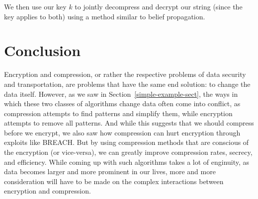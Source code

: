 \documentclass[11pt]{article}
\newcommand\genref{}
\newcommand\sectref{}
\def\genref#1#2{#1~\ref{#2}}
\def\sectref#1{\genref{Section}{#1}}
\begin{document}
We then use our key $k$ to jointly decompress and decrypt our string (since the key applies to both) 
using a method similar to belief propagation.

\section{Conclusion}\label{conclusion-sect}
Encryption and compression, or rather the respective problems of data security and transportation, 
are problems that have the same end solution: to change the data itself. However, as we saw in \sectref{simple-example-sect}, 
the ways in which these two classes of algorithms change data often come into conflict, 
as compression attempts to find patterns and simplify them, while encryption attempts to remove all patterns. 
And while this suggests that we should compress before we encrypt, we also saw how compression can 
hurt encryption through exploits like BREACH. But by using compression methods that are conscious of 
the encryption (or vice-versa)\cite{johnson, sangwan}, we can greatly improve compression rates, secrecy, and efficiency. 
While coming up with such algorithms takes a lot of enginuity, as data becomes larger and more prominent 
in our lives, more and more consideration will have to be made on the complex interactions between encryption and compression. 



% 
% 

\end{document}
